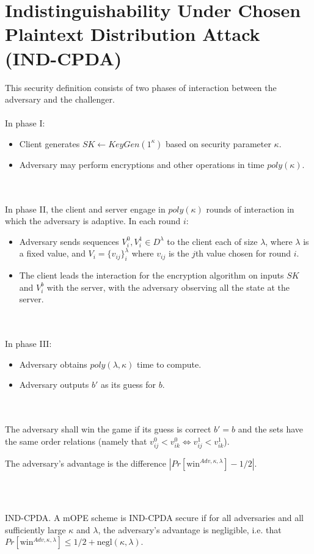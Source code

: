 \documentclass[12pt]{article}
\newenvironment{definition}[1][Definition]{\begin{trivlist}
\item[\hskip \labelsep {\bfseries #1}]}{\end{trivlist}}
\begin{document}
\section{Indistinguishability Under Chosen Plaintext Distribution Attack (IND-CPDA)}
This security definition consists of two phases of interaction between the adversary and the challenger. \\ \\
In phase I:
\begin{itemize}
  \item Client generates $SK \leftarrow KeyGen(1^\kappa)$ based on security parameter $\kappa$.
  \item Adversary may perform encryptions and other operations in time $poly(\kappa)$.
\end{itemize} \\ \\
In phase II, the client and server engage in $poly(\kappa)$ rounds of interaction in which the adversary is adaptive. In each round $i$:
\begin{itemize}
  \item Adversary sends sequences $V_i^0, V_i^1 \in D^{\lambda}$ to the client each of size $\lambda$, where $\lambda$ is a fixed value, and $V_i = \{ v_{ij} \}_i^{\lambda}$ where $v_{ij}$ is the $j$th value chosen for round $i$.
  \item The client leads the interaction for the encryption algorithm on inputs $SK$ and $V_i^b$ with the server, with the adversary observing all the state at the server.
\end{itemize} \\ \\
In phase III:
\begin{itemize}
  \item Adversary obtains $poly(\lambda, \kappa)$ time to compute.
  \item Adversary outputs $b'$ as its guess for $b$. 
\end{itemize} \\ \\
The adversary shall win the game if its guess is correct $b' = b$ and the sets have the same order relations (namely that $v_{ij}^0 < v_{ik}^0 \Leftrightarrow v_{ij}^1 < v_{ik}^1$). 
\begin{definition}
  The adversary's advantage is the difference $|Pr[\textrm{win}^{Adv, \kappa, \lambda}] - 1/2|$.
\end{definition} \\ \\
\begin{definition}
  IND-CPDA. A mOPE scheme is IND-CPDA secure if for all adversaries and all sufficiently large $\kappa$ and $\lambda$, the adversary's advantage is negligible, i.e. that $Pr[\textrm{win}^{Adv, \kappa, \lambda}] \leq 1/2 + \textrm{negl}(\kappa, \lambda)$.
\end{definition}
\end{document}
